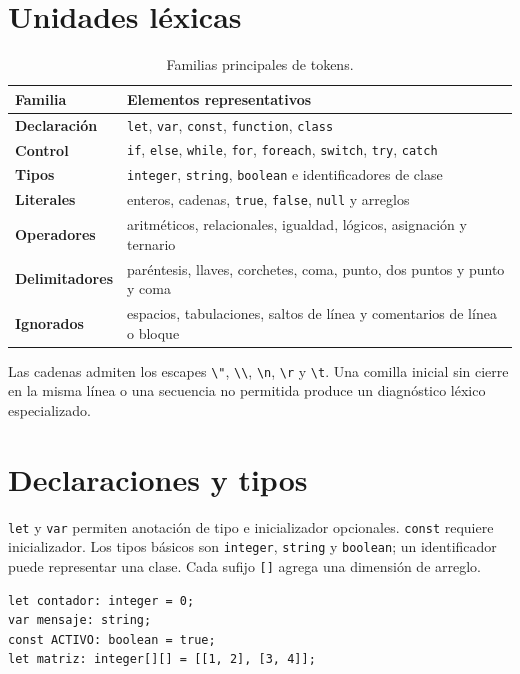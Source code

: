 \documentclass[12pt,letterpaper,oneside]{report}
\newcommand{\archivo}[1]{\texttt{#1}}
\begin{document}
\section{Unidades léxicas}

\begin{table}[H]
\centering
\caption{Familias principales de tokens.}
\label{tab:tokens}
\begin{tabularx}{\textwidth}{>{\bfseries}l X}
\toprule
Familia & Elementos representativos \\
\midrule
Declaración & \archivo{let}, \archivo{var}, \archivo{const}, \archivo{function}, \archivo{class} \\
Control & \archivo{if}, \archivo{else}, \archivo{while}, \archivo{for}, \archivo{foreach}, \archivo{switch}, \archivo{try}, \archivo{catch} \\
Tipos & \archivo{integer}, \archivo{string}, \archivo{boolean} e identificadores de clase \\
Literales & enteros, cadenas, \archivo{true}, \archivo{false}, \archivo{null} y arreglos \\
Operadores & aritméticos, relacionales, igualdad, lógicos, asignación y ternario \\
Delimitadores & paréntesis, llaves, corchetes, coma, punto, dos puntos y punto y coma \\
Ignorados & espacios, tabulaciones, saltos de línea y comentarios de línea o bloque \\
\bottomrule
\end{tabularx}
\end{table}

Las cadenas admiten los escapes \archivo{\textbackslash"},
\archivo{\textbackslash\textbackslash}, \archivo{\textbackslash n},
\archivo{\textbackslash r} y \archivo{\textbackslash t}. Una comilla inicial sin
cierre en la misma línea o una secuencia no permitida produce un diagnóstico léxico
especializado.

\section{Declaraciones y tipos}

\archivo{let} y \archivo{var} permiten anotación de tipo e inicializador opcionales.
\archivo{const} requiere inicializador. Los tipos básicos son \archivo{integer},
\archivo{string} y \archivo{boolean}; un identificador puede representar una clase.
Cada sufijo \archivo{[]} agrega una dimensión de arreglo.

\begin{verbatim}
let contador: integer = 0;
var mensaje: string;
const ACTIVO: boolean = true;
let matriz: integer[][] = [[1, 2], [3, 4]];
\end{verbatim}
\end{document}

